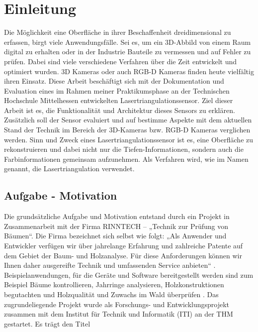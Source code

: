 \section{Einleitung}\label{einleitung}
Die Möglichkeit eine Oberfläche in ihrer Beschaffenheit dreidimensional zu erfassen, birgt viele Anwendungsfälle. Sei es, um ein 3D-Abbild von einem Raum digital zu erhalten oder in der Industrie Bauteile zu vermessen und auf Fehler zu prüfen. Dabei sind viele verschiedene Verfahren über die Zeit entwickelt und optimiert wurden. 3D Kameras oder auch RGB-D Kameras finden heute vielfältig ihren Einsatz. Diese Arbeit beschäftigt sich mit der Dokumentation und Evaluation eines im Rahmen meiner Praktikumsphase an der Technischen Hochschule Mittelhessen entwickelten Lasertriangulationssensor. Ziel dieser Arbeit ist es, die Funktionalität und Architektur dieses Sensors zu erklären. Zusätzlich soll der Sensor evaluiert und auf bestimme Aspekte mit dem aktuellen Stand der Technik im Bereich der 3D-Kameras bzw. RGB-D Kameras verglichen werden.
Sinn und Zweck eines Lasertriangulationssensor ist es, eine Oberfläche zu rekonstruieren und dabei nicht nur die Tiefen-Informationen, sondern auch die Farbinformationen gemeinsam aufzunehmen. Als Verfahren wird, wie im Namen genannt, die Lasertriangulation verwendet.

	\subsection{Aufgabe - Motivation}
	Die grundsätzliche Aufgabe und Motivation entstand durch ein Projekt in Zusammenarbeit mit der Firma RINNTECH – „Technik zur Prüfung von Bäumen“. Die Firma bezeichnet sich selbst wie folgt: „Als Anwender und Entwickler verfügen wir über jahrelange Erfahrung und zahlreiche Patente auf dem Gebiet der Baum- und Holzanalyse. Für diese Anforderungen können wir Ihnen daher ausgereifte Technik und umfassenden Service anbieten“ \citep[vgl.][]{noauthor_rinntech_nodate}. Beispielanwendungen, für die Geräte und Software bereitgestellt werden sind zum Beispiel Bäume kontrollieren, Jahrringe analysieren, Holzkonstruktionen begutachten und Holzqualität und Zuwachs im Wald überprüfen \citep[vgl.][]{noauthor_rinntech_nodate}. Das zugrundeliegende Projekt wurde als Forschungs- und Entwicklungsprojekt zusammen mit dem Institut für Technik und Informatik (ITI) an der THM gestartet. Es trägt den Titel
	
